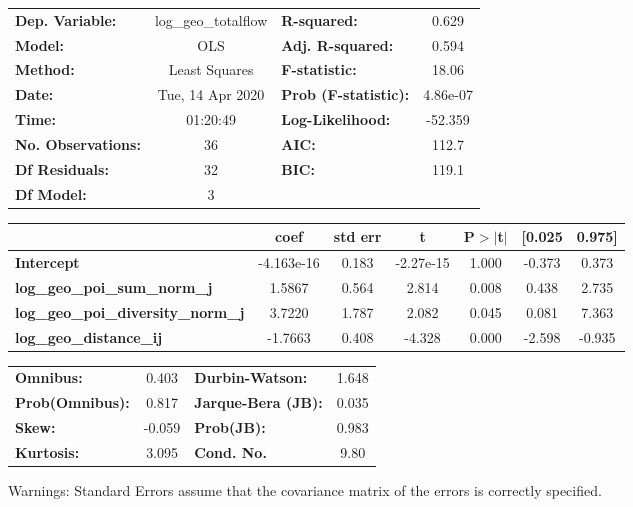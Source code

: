 \begin{center}
\begin{tabular}{lclc}
\toprule
\textbf{Dep. Variable:}                    & log\_geo\_totalflow & \textbf{  R-squared:         } &     0.629   \\
\textbf{Model:}                            &         OLS         & \textbf{  Adj. R-squared:    } &     0.594   \\
\textbf{Method:}                           &    Least Squares    & \textbf{  F-statistic:       } &     18.06   \\
\textbf{Date:}                             &   Tue, 14 Apr 2020  & \textbf{  Prob (F-statistic):} &  4.86e-07   \\
\textbf{Time:}                             &       01:20:49      & \textbf{  Log-Likelihood:    } &   -52.359   \\
\textbf{No. Observations:}                 &            36       & \textbf{  AIC:               } &     112.7   \\
\textbf{Df Residuals:}                     &            32       & \textbf{  BIC:               } &     119.1   \\
\textbf{Df Model:}                         &             3       & \textbf{                     } &             \\
\bottomrule
\end{tabular}
\begin{tabular}{lcccccc}
                                           & \textbf{coef} & \textbf{std err} & \textbf{t} & \textbf{P$> |$t$|$} & \textbf{[0.025} & \textbf{0.975]}  \\
\midrule
\textbf{Intercept}                         &   -4.163e-16  &        0.183     & -2.27e-15  &         1.000        &       -0.373    &        0.373     \\
\textbf{log\_geo\_poi\_sum\_norm\_j}       &       1.5867  &        0.564     &     2.814  &         0.008        &        0.438    &        2.735     \\
\textbf{log\_geo\_poi\_diversity\_norm\_j} &       3.7220  &        1.787     &     2.082  &         0.045        &        0.081    &        7.363     \\
\textbf{log\_geo\_distance\_ij}            &      -1.7663  &        0.408     &    -4.328  &         0.000        &       -2.598    &       -0.935     \\
\bottomrule
\end{tabular}
\begin{tabular}{lclc}
\textbf{Omnibus:}       &  0.403 & \textbf{  Durbin-Watson:     } &    1.648  \\
\textbf{Prob(Omnibus):} &  0.817 & \textbf{  Jarque-Bera (JB):  } &    0.035  \\
\textbf{Skew:}          & -0.059 & \textbf{  Prob(JB):          } &    0.983  \\
\textbf{Kurtosis:}      &  3.095 & \textbf{  Cond. No.          } &     9.80  \\
\bottomrule
\end{tabular}
\end{center}

Warnings: \newline
 [1] Standard Errors assume that the covariance matrix of the errors is correctly specified.